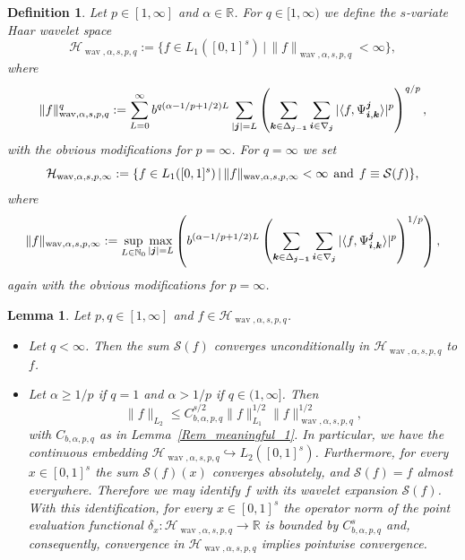 \documentclass[12pt]{article}
\DeclareMathOperator{\wav}{wav}
\newtheorem{lemma}{Lemma}
\newtheorem{definition}{Definition}
\newcommand{\bsk}{\boldsymbol{k}}
\newcommand{\bsi}{\boldsymbol{i}}
\newcommand{\bsj}{\boldsymbol{j}}
\newcommand{\RR}{\mathbb{R}}
\newcommand{\HH}{\mathcal{H}}
\newcommand{\N}{\mathbb{N}}
\begin{document}
\begin{definition}\label{Def:Wavelet_Space_Multi}
Let $p \in [1,\infty]$ and $\alpha\in\RR$.  For $q\in [1, \infty)$ we define the \emph{$s$-variate Haar wavelet space}
\begin{equation*}
\HH_{\wav,\alpha,s,p,q} := \{ f\in L_1([0,1]^s) \,|\,
\|f\|_{\wav, \alpha,s,p,q} < \infty \},
\end{equation*}
where
\begin{equation*}
\|f\|^q_{\wav,\alpha,s,p,q} :=
\sum^\infty_{L=0} b^{q(\alpha-1/p+1/2)L} \sum_{|\bsj|=L}
\left( \sum_{\bsk\in \Delta_{\bsj -{\bf 1}}} 
\sum_{\bsi \in \nabla_{\bsj}}
|\langle f, \Psi^{\bsj}_{\bsi,\bsk} \rangle |^p
\right)^{q/p},
\end{equation*}
with the obvious modifications for $p = \infty$.
For $q = \infty$ we set
\begin{equation*}
\HH_{\wav,\alpha,s,p,\infty} := \{ f\in L_1([0,1]^s) \,|\,
\|f\|_{\wav, \alpha,s,p,\infty} < \infty \hspace{1ex}\text{and}\hspace{1ex} f \equiv \mathcal{S}(f) \},
\end{equation*}
where
\begin{equation*}
\|f\|_{\wav,\alpha,s,p,\infty} :=
\sup_{L\in \N_0}  \max_{|\bsj|=L} \left( b^{(\alpha-1/p+1/2)L}
\left( \sum_{\bsk\in \Delta_{\bsj -{\bf 1}}} 
\sum_{\bsi \in \nabla_{\bsj}}
|\langle f, \Psi^{\bsj}_{\bsi,\bsk} \rangle |^p
\right)^{1/p} \right),
\end{equation*}
again with the obvious modifications for $p= \infty$.
\end{definition}


\begin{lemma}\label{Rem_meaningful}
Let $p,q \in [1,\infty]$ and $f \in \mathcal{H}_{\wav, \alpha,s, p,q}$. 
\begin{itemize}
\item[(i)] Let $q <\infty$. Then the sum $\mathcal{S}(f)$ 
converges unconditionally in $\HH_{\wav,\alpha,s, p,q}$ to $f$.
\item[(ii)] Let $\alpha \ge 1/p$ if $q=1$ and $\alpha>1/p$ if $q\in (1,\infty]$. 
Then 
\begin{equation*}
\|f\|_{L_2} \le C^{s/2}_{b,\alpha,p,q}  \|f\|_{L_1}^{1/2} \|f\|^{1/2}_{\wav, \alpha, s, p,q},
\end{equation*}
with  $C_{b,\alpha,p,q}$
as in Lemma~\ref{Rem_meaningful_1}. 
In particular, we have the 
continuous embedding 
$\HH_{\wav,\alpha,s, p,q} \hookrightarrow L_2([0,1]^s)$.
Furthermore, for every $x\in [0,1]^s$ the sum
$\mathcal{S}(f)(x)$ converges absolutely, and $\mathcal{S}(f) = f$ almost everywhere.
Therefore we may identify $f$ with its wavelet expansion $\mathcal{S}(f)$.
With this identification, for every $x\in [0,1]^s$ the  operator norm of the point evaluation functional $\delta_x: \HH_{\wav,\alpha,s, p,q} \to \RR$ is bounded by $C_{b,\alpha,p,q}^s$ and, consequently,
convergence in $\HH_{\wav,\alpha, s, p,q}$ implies pointwise
convergence. 
\end{itemize}
\end{lemma}
\end{document}
